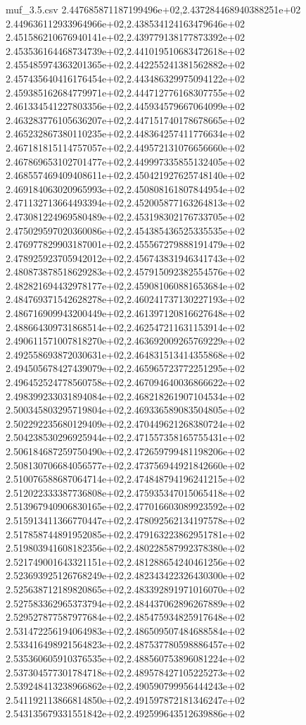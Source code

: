 \begin{filecontents*}{muf_3.5.csv}
2.447685871187199496e+02,2.437284468940388251e+02
2.449636112933964966e+02,2.438534124163479646e+02
2.451586210676940141e+02,2.439779138177873392e+02
2.453536164468734739e+02,2.441019510683472618e+02
2.455485974363201365e+02,2.442255241381562882e+02
2.457435640416176454e+02,2.443486329975094122e+02
2.459385162684779971e+02,2.444712776168307755e+02
2.461334541227803356e+02,2.445934579667064099e+02
2.463283776105636207e+02,2.447151740178678665e+02
2.465232867380110235e+02,2.448364257411776634e+02
2.467181815114757057e+02,2.449572131076656660e+02
2.467869653102701477e+02,2.449997335855132405e+02
2.468557469409408611e+02,2.450421927625748140e+02
2.469184063020965993e+02,2.450808161807844954e+02
2.471132713664493394e+02,2.452005877163264813e+02
2.473081224969580489e+02,2.453198302176733705e+02
2.475029597020360086e+02,2.454385436525335535e+02
2.476977829903187001e+02,2.455567279888191479e+02
2.478925923705942012e+02,2.456743831946341743e+02
2.480873878518629283e+02,2.457915092382554576e+02
2.482821694432978177e+02,2.459081060881653684e+02
2.484769371542628278e+02,2.460241737130227193e+02
2.486716909943200449e+02,2.461397120816627648e+02
2.488664309731868514e+02,2.462547211631153914e+02
2.490611571007818270e+02,2.463692009265769229e+02
2.492558693872030631e+02,2.464831513414355868e+02
2.494505678427439079e+02,2.465965723772251295e+02
2.496452524778560758e+02,2.467094640036866622e+02
2.498399233031894084e+02,2.468218261907104534e+02
2.500345803295719804e+02,2.469336589083504805e+02
2.502292235680129409e+02,2.470449621268380724e+02
2.504238530296925944e+02,2.471557358165755431e+02
2.506184687259750490e+02,2.472659799481198206e+02
2.508130706684056577e+02,2.473756944921842660e+02
2.510076588687064714e+02,2.474848794196241215e+02
2.512022333387736808e+02,2.475935347015065418e+02
2.513967940906830165e+02,2.477016603089923592e+02
2.515913411366770447e+02,2.478092562134197578e+02
2.517858744891952085e+02,2.479163223862951781e+02
2.519803941608182356e+02,2.480228587992378380e+02
2.521749001643321151e+02,2.481288654240461256e+02
2.523693925126768249e+02,2.482343422326430300e+02
2.525638712189820865e+02,2.483392891971016070e+02
2.527583362965373794e+02,2.484437062896267889e+02
2.529527877587977684e+02,2.485475934825917648e+02
2.531472256194064983e+02,2.486509507484688584e+02
2.533416498921564823e+02,2.487537780598886457e+02
2.535360605910376535e+02,2.488560753896081224e+02
2.537304577301784718e+02,2.489578427105225273e+02
2.539248413238966862e+02,2.490590799956444243e+02
2.541192113866814850e+02,2.491597872181346247e+02
2.543135679331551842e+02,2.492599643512639886e+02

\end{filecontents*}
